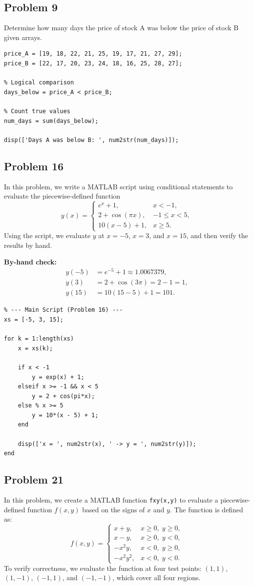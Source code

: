 \documentclass[DIN, pagenumber=false, fontsize=11pt, parskip=half]{scrartcl}
\newcommand{\myproblem}[1]{\subsection*{#1}}
\begin{document}
\myproblem{Problem 9}
Determine how many days the price of stock A was below the price of stock B given arrays.

\begin{lstlisting}
price_A = [19, 18, 22, 21, 25, 19, 17, 21, 27, 29];
price_B = [22, 17, 20, 23, 24, 18, 16, 25, 28, 27];

% Logical comparison
days_below = price_A < price_B;

% Count true values
num_days = sum(days_below);

disp(['Days A was below B: ', num2str(num_days)]);
\end{lstlisting}

\myproblem{Problem 16}
In this problem, we write a MATLAB script using conditional statements to evaluate the piecewise-defined function
\[
y(x)=
\begin{cases}
e^{x}+1, & x<-1,\\[4pt]
2+\cos(\pi x), & -1\le x<5,\\[4pt]
10(x-5)+1, & x\ge 5.
\end{cases}
\]
Using the script, we evaluate $y$ at $x=-5$, $x=3$, and $x=15$, and then verify the results by hand.

\noindent\textbf{By-hand check:}
\[
\begin{aligned}
y(-5) &= e^{-5}+1 \approx 1.0067379,\\
y(3)  &= 2+\cos(3\pi)=2-1=1,\\
y(15) &= 10(15-5)+1=101.
\end{aligned}
\]

\begin{lstlisting}
% --- Main Script (Problem 16) ---
xs = [-5, 3, 15];

for k = 1:length(xs)
    x = xs(k);

    if x < -1
        y = exp(x) + 1;
    elseif x >= -1 && x < 5
        y = 2 + cos(pi*x);
    else % x >= 5
        y = 10*(x - 5) + 1;
    end

    disp(['x = ', num2str(x), ' -> y = ', num2str(y)]);
end
\end{lstlisting}

\myproblem{Problem 21}
In this problem, we create a MATLAB function \texttt{fxy(x,y)} to evaluate a piecewise-defined function $f(x,y)$ based on the signs of $x$ and $y$. The function is defined as:
\[
f(x,y)=
\begin{cases}
x+y, & x\ge 0,\; y\ge 0,\\
x-y, & x\ge 0,\; y<0,\\
-x^2y, & x<0,\; y\ge 0,\\
-x^2y^2, & x<0,\; y<0.
\end{cases}
\]
To verify correctness, we evaluate the function at four test points: $(1,1)$, $(1,-1)$, $(-1,1)$, and $(-1,-1)$, which cover all four regions.
\end{document}
